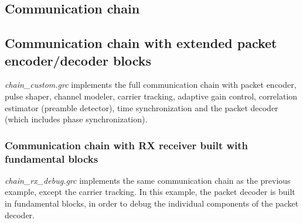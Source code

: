 \subsection{Communication chain}
\subsection*{Communication chain with extended packet encoder/decoder blocks}
\textit{chain\_custom.grc} implements the full communication chain with packet encoder, pulse shaper, channel modeler, carrier tracking, adaptive gain control, correlation estimator (preamble detector), time synchronization and the packet decoder (which includes phase synchronization).

\subsubsection*{Communication chain with RX receiver built with fundamental blocks}
\textit{chain\_rx\_debug.grc} implements the same communication chain as the previous example, except the carrier tracking. In this example, the packet decoder is built in fundamental blocks, in order to debug the individual components of the packet decoder.









